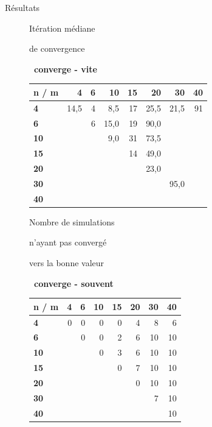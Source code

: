 \documentclass[10pt,xcolor=table,color={dvipsnames,usenames},ignorenonframetext,usepdftitle=false,french]{beamer}
\begin{document}
\begin{frame}{Résultats}
\protect\hypertarget{ruxe9sultats-4}{}

\tiny
\begin{figure}
\begin{minipage}{.4\textwidth}
\normalsize{Itération médiane

de convergence

\faArrowCircleRight \textbf{\ converge - vite}
}
\end{minipage}%
\begin{minipage}{.6\textwidth}

\begin{tabular}{>{\bfseries}l|r|r|r|r|r|r|r}
\hline
\textbf{n / m } & \textbf{4} & \textbf{6} & \textbf{10} & \textbf{15} & \textbf{20} & \textbf{30} & \textbf{40}\\
\hline
4 & 14,5 & 4 & 8,5 & 17 & 25,5 & 21,5 & 91\\
\hline
6 &  & 6 & 15,0 & 19 & 90,0 &  & \\
\hline
10 &  &  & 9,0 & 31 & 73,5 &  & \\
\hline
15 &  &  &  & 14 & 49,0 &  & \\
\hline
20 &  &  &  &  & 23,0 &  & \\
\hline
30 &  &  &  &  &  & 95,0 & \\
\hline
40 &  &  &  &  &  &  & \\
\hline
\end{tabular}
\end{minipage}
\end{figure}

\begin{figure}
\begin{minipage}{.4\textwidth}
\normalsize{Nombre de simulations

n'ayant pas convergé

vers la bonne valeur

\faArrowCircleRight \textbf{\ converge - souvent}
}
\end{minipage}%
\begin{minipage}{.6\textwidth}

\begin{tabular}{>{\bfseries}l|r|r|r|r|r|r|r}
\hline
\textbf{n / m } & \textbf{4} & \textbf{6} & \textbf{10} & \textbf{15} & \textbf{20} & \textbf{30} & \textbf{40}\\
\hline
4 & 0 & 0 & 0 & 0 & 4 & 8 & 6\\
\hline
6 &  & 0 & 0 & 2 & 6 & 10 & 10\\
\hline
10 &  &  & 0 & 3 & 6 & 10 & 10\\
\hline
15 &  &  &  & 0 & 7 & 10 & 10\\
\hline
20 &  &  &  &  & 0 & 10 & 10\\
\hline
30 &  &  &  &  &  & 7 & 10\\
\hline
40 &  &  &  &  &  &  & 10\\
\hline
\end{tabular}


\end{minipage}
\end{figure}
\end{frame}
\end{document}

